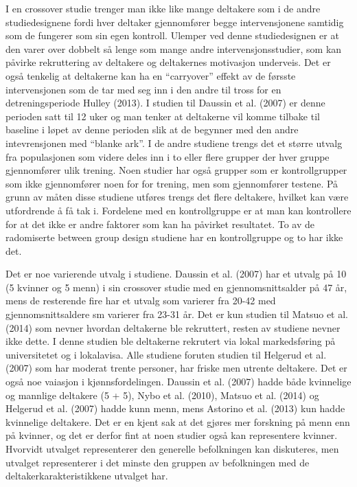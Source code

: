 \documentclass[
  letterpaper,
  DIV=11,
  numbers=noendperiod]{scrartcl}
\begin{document}
I en crossover studie trenger man ikke like mange deltakere som i de
andre studiedesignene fordi hver deltaker gjennomfører begge
intervensjonene samtidig som de fungerer som sin egen kontroll. Ulemper
ved denne studiedesignen er at den varer over dobbelt så lenge som mange
andre intervensjonsstudier, som kan påvirke rekruttering av deltakere og
deltakernes motivasjon underveis. Det er også tenkelig at deltakerne kan
ha en ``carryover'' effekt av de førsste intervensjonen som de tar med
seg inn i den andre til tross for en detreningsperiode Hulley (2013). I
studien til Daussin et al. (2007) er denne perioden satt til 12 uker og
man tenker at deltakerne vil komme tilbake til baseline i løpet av denne
perioden slik at de begynner med den andre intevrensjonen med ``blanke
ark''. I de andre studiene trengs det et større utvalg fra populasjonen
som videre deles inn i to eller flere grupper der hver gruppe
gjennomfører ulik trening. Noen studier har også grupper som er
kontrollgrupper som ikke gjennomfører noen for for trening, men som
gjennomfører testene. På grunn av måten disse studiene utføres trengs
det flere deltakere, hvilket kan være utfordrende å få tak i. Fordelene
med en kontrollgruppe er at man kan kontrollere for at det ikke er andre
faktorer som kan ha påvirket resultatet. To av de radomiserte between
group design studiene har en kontrollgruppe og to har ikke det.

Det er noe varierende utvalg i studiene. Daussin et al. (2007) har et
utvalg på 10 (5 kvinner og 5 menn) i sin crossover studie med en
gjennomsnittsalder på 47 år, mens de resterende fire har et utvalg som
varierer fra 20-42 med gjennomsnittsaldere sm varierer fra 23-31 år. Det
er kun studien til Matsuo et al. (2014) som nevner hvordan deltakerne
ble rekruttert, resten av studiene nevner ikke dette. I denne studien
ble deltakerne rekrutert via lokal markedsføring på universitetet og i
lokalavisa. Alle studiene foruten studien til Helgerud et al. (2007) som
har moderat trente personer, har friske men utrente deltakere. Det er
også noe vaiasjon i kjønnsfordelingen. Daussin et al. (2007) hadde både
kvinnelige og mannlige deltakere (5 + 5), Nybo et al. (2010), Matsuo et
al. (2014) og Helgerud et al. (2007) hadde kunn menn, mens Astorino et
al. (2013) kun hadde kvinnelige deltakere. Det er en kjent sak at det
gjøres mer forskning på menn enn på kvinner, og det er derfor fint at
noen studier også kan representere kvinner. Hvorvidt utvalget
representerer den generelle befolkningen kan diskuteres, men utvalget
representerer i det minste den gruppen av befolkningen med de
deltakerkarakteristikkene utvalget har.
\end{document}
